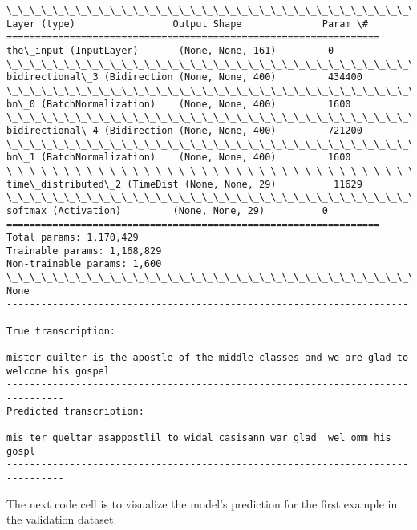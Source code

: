 \documentclass[11pt]{article}
\begin{document}
    \begin{Verbatim}[commandchars=\\\{\}]
\_\_\_\_\_\_\_\_\_\_\_\_\_\_\_\_\_\_\_\_\_\_\_\_\_\_\_\_\_\_\_\_\_\_\_\_\_\_\_\_\_\_\_\_\_\_\_\_\_\_\_\_\_\_\_\_\_\_\_\_\_\_\_\_\_
Layer (type)                 Output Shape              Param \#   
=================================================================
the\_input (InputLayer)       (None, None, 161)         0         
\_\_\_\_\_\_\_\_\_\_\_\_\_\_\_\_\_\_\_\_\_\_\_\_\_\_\_\_\_\_\_\_\_\_\_\_\_\_\_\_\_\_\_\_\_\_\_\_\_\_\_\_\_\_\_\_\_\_\_\_\_\_\_\_\_
bidirectional\_3 (Bidirection (None, None, 400)         434400    
\_\_\_\_\_\_\_\_\_\_\_\_\_\_\_\_\_\_\_\_\_\_\_\_\_\_\_\_\_\_\_\_\_\_\_\_\_\_\_\_\_\_\_\_\_\_\_\_\_\_\_\_\_\_\_\_\_\_\_\_\_\_\_\_\_
bn\_0 (BatchNormalization)    (None, None, 400)         1600      
\_\_\_\_\_\_\_\_\_\_\_\_\_\_\_\_\_\_\_\_\_\_\_\_\_\_\_\_\_\_\_\_\_\_\_\_\_\_\_\_\_\_\_\_\_\_\_\_\_\_\_\_\_\_\_\_\_\_\_\_\_\_\_\_\_
bidirectional\_4 (Bidirection (None, None, 400)         721200    
\_\_\_\_\_\_\_\_\_\_\_\_\_\_\_\_\_\_\_\_\_\_\_\_\_\_\_\_\_\_\_\_\_\_\_\_\_\_\_\_\_\_\_\_\_\_\_\_\_\_\_\_\_\_\_\_\_\_\_\_\_\_\_\_\_
bn\_1 (BatchNormalization)    (None, None, 400)         1600      
\_\_\_\_\_\_\_\_\_\_\_\_\_\_\_\_\_\_\_\_\_\_\_\_\_\_\_\_\_\_\_\_\_\_\_\_\_\_\_\_\_\_\_\_\_\_\_\_\_\_\_\_\_\_\_\_\_\_\_\_\_\_\_\_\_
time\_distributed\_2 (TimeDist (None, None, 29)          11629     
\_\_\_\_\_\_\_\_\_\_\_\_\_\_\_\_\_\_\_\_\_\_\_\_\_\_\_\_\_\_\_\_\_\_\_\_\_\_\_\_\_\_\_\_\_\_\_\_\_\_\_\_\_\_\_\_\_\_\_\_\_\_\_\_\_
softmax (Activation)         (None, None, 29)          0         
=================================================================
Total params: 1,170,429
Trainable params: 1,168,829
Non-trainable params: 1,600
\_\_\_\_\_\_\_\_\_\_\_\_\_\_\_\_\_\_\_\_\_\_\_\_\_\_\_\_\_\_\_\_\_\_\_\_\_\_\_\_\_\_\_\_\_\_\_\_\_\_\_\_\_\_\_\_\_\_\_\_\_\_\_\_\_
None
--------------------------------------------------------------------------------
True transcription:

mister quilter is the apostle of the middle classes and we are glad to welcome his gospel
--------------------------------------------------------------------------------
Predicted transcription:

mis ter queltar asappostlil to widal casisann war glad  wel omm his gospl
--------------------------------------------------------------------------------

    \end{Verbatim}

    The next code cell is to visualize the model's prediction for the first
example in the validation dataset.
\end{document}
